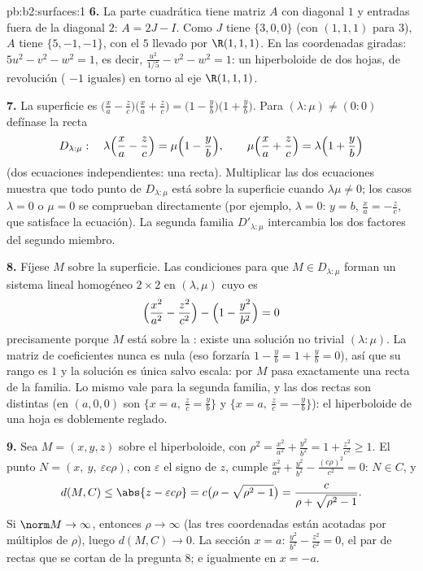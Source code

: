 \begin{solution}{pb:b2:surfaces:1}
\textbf{6.} La parte cuadrática tiene matriz $A$ con diagonal $1$ y
entradas fuera de la diagonal $2$: $A = 2J - I$. Como $J$ tiene
 $\{3, 0, 0\}$ (con  $(1,1,1)$ para $3$), $A$
tiene  $\{5, -1, -1\}$, con el  $5$ llevado por
$\R(1,1,1)$. En las coordenadas giradas: $5u^2 - v^2 - w^2 = 1$, es
decir, $\frac{u^2}{1/5} - v^2 - w^2 = 1$: un hiperboloide de dos
hojas, de revolución ( $-1$ iguales) en torno al eje
$\R(1,1,1)$.

\textbf{7.} La superficie es $\bigl(\frac xa - \frac
zc\bigr)\bigl(\frac xa + \frac zc\bigr) = \bigl(1 - \frac
yb\bigr)\bigl(1 + \frac yb\bigr)$. Para $(\lambda : \mu) \neq (0:0)$
defínase la recta
\[
D_{\lambda:\mu} :\quad
\lambda\Bigl(\frac xa - \frac zc\Bigr) = \mu\Bigl(1 - \frac
yb\Bigr), \qquad
\mu\Bigl(\frac xa + \frac zc\Bigr) = \lambda\Bigl(1 + \frac
yb\Bigr)
\]
(dos ecuaciones  independientes: una recta). Multiplicar las
dos ecuaciones muestra que todo punto de $D_{\lambda:\mu}$ está sobre
la superficie cuando $\lambda\mu \neq 0$; los casos $\lambda = 0$ o
$\mu = 0$ se comprueban directamente (por ejemplo, $\lambda = 0$: $y
= b$, $\frac xa = -\frac zc$, que satisface la ecuación). La segunda
familia $D'_{\lambda:\mu}$ intercambia los dos factores del segundo
miembro.

\textbf{8.} Fíjese $M$ sobre la superficie. Las condiciones para que
$M \in D_{\lambda:\mu}$ forman un sistema lineal homogéneo $2\times2$
en $(\lambda, \mu)$ cuyo  es
\[
\Bigl(\frac{x^2}{a^2} - \frac{z^2}{c^2}\Bigr) - \Bigl(1 -
\frac{y^2}{b^2}\Bigr) = 0
\]
precisamente porque $M$ está sobre la : existe una solución
no trivial $(\lambda : \mu)$. La matriz de coeficientes nunca es nula
(eso forzaría $1 - \frac yb = 1 + \frac yb = 0$), así que su rango es
$1$ y la solución es única salvo escala: por $M$ pasa exactamente una
recta de la familia. Lo mismo vale para la segunda familia, y las dos
rectas son distintas (en $(a, 0, 0)$ son $\{x = a,\ \frac zc = \frac
yb\}$ y $\{x = a,\ \frac zc = -\frac yb\}$): el hiperboloide de una
hoja es doblemente reglado.

\textbf{9.} Sea $M = (x, y, z)$ sobre el hiperboloide, con $\rho^2 =
\frac{x^2}{a^2} + \frac{y^2}{b^2} = 1 + \frac{z^2}{c^2} \geq 1$. El
punto $N = (x,\ y,\ \varepsilon c\rho)$, con $\varepsilon$ el signo
de $z$, cumple $\frac{x^2}{a^2} + \frac{y^2}{b^2} -
\frac{(c\rho)^2}{c^2} = 0$: $N \in C$, y
\[
d(M, C) \leq \abs{z - \varepsilon c\rho}
= c\bigl(\rho - \sqrt{\rho^2 - 1}\bigr)
= \frac{c}{\rho + \sqrt{\rho^2 - 1}} .
\]
Si $\norm M \to \infty$, entonces $\rho \to \infty$ (las tres
coordenadas están acotadas por múltiplos de $\rho$), luego $d(M, C)
\to 0$. La sección $x = a$: $\frac{y^2}{b^2} - \frac{z^2}{c^2} = 0$,
el par de rectas que se cortan de la pregunta 8; e igualmente en $x =
-a$.


\end{solution}
